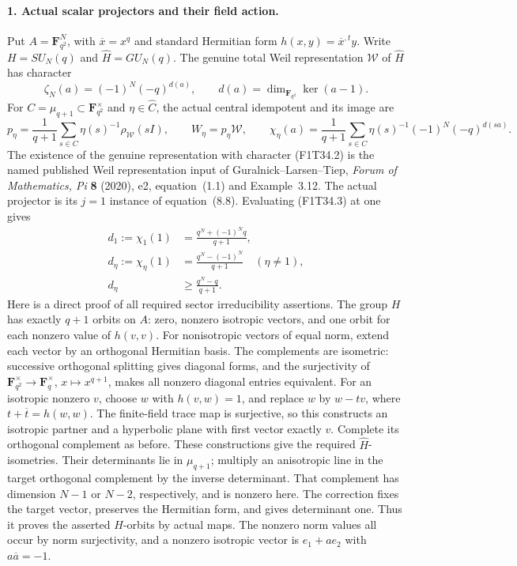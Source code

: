 \paragraph{1. Actual scalar projectors and their field action.}
Put \(A=\mathbf F_{q^2}^{N}\), with
\(\overline{x}=x^q\) and standard Hermitian form
\(h(x,y)=\overline{x}^{,t}y\). Write
\(H=SU_N(q)\) and \(\widehat H=GU_N(q)\).
The genuine total Weil representation \(\mathcal W\)
of \(\widehat H\) has character
\[
 \zeta_N(a)=(-1)^N(-q)^{d(a)},\qquad
 d(a)=\dim_{\mathbf F_{q^2}}\ker(a-1).
 \tag{F1T34.2}
\]
For \(C=\mu_{q+1}\subset\mathbf F_{q^2}^{\times}\)
and \(\eta\in\widehat C\), the actual central
idempotent and its image are
\[
 p_\eta=\frac1{q+1}\sum_{s\in C}
             \eta(s)^{-1}\rho_{\mathcal W}(sI),
 \qquad W_\eta=p_\eta\mathcal W,
 \qquad
 \chi_\eta(a)=\frac1{q+1}\sum_{s\in C}
                 \eta(s)^{-1}(-1)^N(-q)^{d(sa)}.
 \tag{F1T34.3}
\]
The existence of the genuine representation with
character (F1T34.2) is the named published Weil
representation input of Guralnick--Larsen--Tiep,
\emph{Forum of Mathematics, Pi} \textbf{8} (2020),
e2, equation~(1.1) and Example~3.12. The actual
projector is its \(j=1\) instance of equation~(8.8).
Evaluating (F1T34.3) at one gives
\[
 \begin{aligned}
 d_1:=\chi_1(1)&=\frac{q^N+(-1)^Nq}{q+1},\\
 d_\eta:=\chi_\eta(1)&=\frac{q^N-(-1)^N}{q+1}
                         \quad(\eta\ne1),\\
 d_\eta&\ge\frac{q^N-q}{q+1}.
 \end{aligned}
 \tag{F1T34.4}
\]
Here is a direct proof of all required sector
irreducibility assertions. The group \(H\) has
exactly \(q+1\) orbits on \(A\): zero, nonzero
isotropic vectors, and one orbit for each nonzero
value of \(h(v,v)\). For nonisotropic vectors of
equal norm, extend each vector by an orthogonal
Hermitian basis. The complements are isometric:
successive orthogonal splitting gives diagonal
forms, and the surjectivity of
\(\mathbf F_{q^2}^{\times}\to\mathbf F_q^{\times}\),
\(x\mapsto x^{q+1}\), makes all nonzero diagonal
entries equivalent. For an isotropic nonzero
\(v\), choose \(w\) with \(h(v,w)=1\), and replace
\(w\) by \(w-tv\), where
\(t+\overline t=h(w,w)\). The finite-field trace
map is surjective, so this constructs an isotropic
partner and a hyperbolic plane with first vector
exactly \(v\). Complete its orthogonal complement
as before. These constructions give the required
\(\widehat H\)-isometries. Their determinants lie
in \(\mu_{q+1}\); multiply an anisotropic line in
the target orthogonal complement by the inverse
determinant. That complement has dimension \(N-1\)
or \(N-2\), respectively, and is nonzero here.
The correction fixes the target vector, preserves
the Hermitian form, and gives determinant one.
Thus it proves the asserted \(H\)-orbits by actual
maps. The nonzero norm values all occur by norm
surjectivity, and a nonzero isotropic vector is
\(e_1+ae_2\) with \(a\overline a=-1\).

